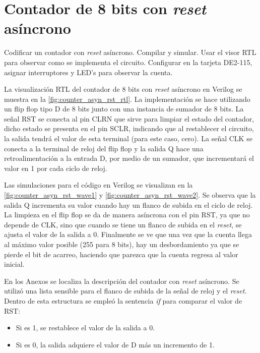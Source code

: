 \section{Contador de 8 bits con \textit{reset} asíncrono \label{sec:s3}}

\begin{center}
	\begin{minipage}{12cm}
		\begin{tcolorbox}[title=Actividad 3]
			 Codificar un contador con \textit{reset} asíncrono. Compilar y simular. Usar el visor RTL para observar como se implementa el circuito. Configurar en la tarjeta DE2-115, asignar interruptores y LED's para observar la cuenta.
		\end{tcolorbox}	
	\end{minipage}
\end{center}

La visualización RTL del contador de 8 bits con \textit{reset} asíncrono en Verilog se muestra en la \autoref{fig:counter_asyn_rst_rtl}. La implementación se hace utilizando un flip flop tipo D de 8 bits junto con una instancia de sumador de 8 bits. La señal RST se conecta al pin CLRN que sirve para limpiar el estado del contador, dicho estado se presenta en el pin SCLR, indicando que al restablecer el circuito, la salida tendrá el valor de esta terminal (para este caso, cero). La señal CLK se conecta a la terminal de reloj del flip flop y la salida Q hace una retroalimentación a la entrada D, por medio de un sumador, que incrementará el valor en 1 por cada ciclo de reloj.

Las simulaciones para el código en Verilog se visualizan en la \autoref{fig:counter_asyn_rst_wave1} y \autoref{fig:counter_asyn_rst_wave2}. Se observa que la salida Q incrementa su valor cuando hay un flanco de subida en el ciclo de reloj. La limpieza en el flip flop se da de manera asíncrona con el pin RST, ya que no depende de CLK, sino que cuando se tiene un flanco de subida en el \textit{reset}, se ajusta el valor de la salida a 0. Finalmente se ve que una vez que la cuenta llega al máximo valor posible (255 para 8 bits), hay un desbordamiento ya que se pierde el bit de acarreo, haciendo que parezca que la cuenta regresa al valor inicial.

En los Anexos se localiza la descripción del contador con \textit{reset} asíncrono. Se utilizó una lista sensible para el flanco de subida de la señal de reloj y el \textit{reset}. Dentro de esta estructura se empleó la sentencia \textit{if} para comparar el valor de RST: 
\begin{itemize}
	\item Si es 1, se restablece el valor de la salida a 0. 
	\item Si es 0, la salida adquiere el valor de D más un incremento de 1.
\end{itemize}

